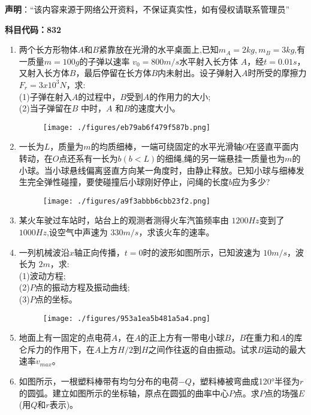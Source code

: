 
\textbf{声明}：“该内容来源于网络公开资料，不保证真实性，如有侵权请联系管理员”



\textbf{科目代码：832}
\begin{enumerate}
\item 两个长方形物体$A$和$B$紧靠放在光滑的水平桌面上,已知$m_A=2kg,m_B=3kg$,有一质量$ m=100g$的子弹以速率 $v_0=800m/s$水平射入长方体 $A$，经$t=0.01s$，又射入长方体$B$，最后停留在长方体$B$内未射出。设子弹射入$A$时所受的摩擦力$F_r=3x10^3N$，求:\\
(1)子弹在射入$A$的过程中，$B $受到$A$的作用力的大小;\\
(2)当子弹留在$ B$ 中时，$A$ 和$B$的速度大小。
\begin{figure}[ht]
\centering
\texttt{[image: ./figures/eb79ab6f479f587b.png]}
\caption{} \label{fig_SD11_3}
\end{figure}
\item 一长为$L$，质量为$m$的均质细棒，一端可绕固定的水平光滑轴$O$在竖直平面内转动，在$O$点还系有一长为$b(b<L)$的细绳,绳的另一端悬挂一质量也为$m$的小球。当小球悬线偏离竖直方向某一角度时，由静止释放。已知小球与细棒发生完全弹性碰撞，要使碰撞后小球刚好停止，问绳的长度$b$应为多少?
\begin{figure}[ht]
\centering
\texttt{[image: ./figures/a9f3abbb6cbb23f2.png]}
\caption{} \label{fig_SD11_4}
\end{figure}
\item 某火车驶过车站时，站台上的观测者测得火车汽笛频率由 $1200Hz$变到了 $1000 Hz$,设空气中声速为 $330m/s$，求该火车的速率。
\item 一列机械波沿$x$轴正向传播，$t=0$时的波形如图所示，已知波速为 $10m/s$，波长为 $2m$，求:\\
(1)波动方程;\\
(2)$P$点的振动方程及振动曲线;\\
(3)$P $点的坐标。
\begin{figure}[ht]
\centering
\texttt{[image: ./figures/953a1ea5b481a5a4.png]}
\caption{} \label{fig_SD11_5}
\end{figure}
\item 地面上有一固定的点电荷$ A$，在$A$的正上方有一带电小球$B$，$B$在重力和$A$的库仑斥力的作用下，在$A$上方$ H/2 $到$H$之间作往返的自由振动。试求$B$运动的最大速率$v_{max}$。
\item  如图所示，一根塑料棒带有均匀分布的电荷$-Q$，塑料棒被弯曲成120°半径为$r$的圆弧。建立如图所示的坐标轴，原点在圆弧的曲率中心$P$点。求$P$点的场强$E$(用$Q$和$r$表示)。

\end{enumerate}

